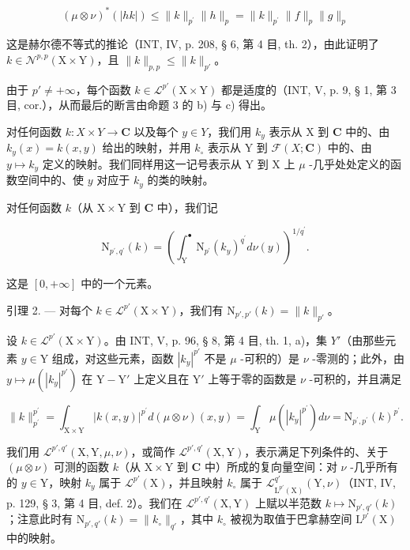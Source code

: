 \[
(\mu \otimes \nu) ^ {*} (| h k |) \leqslant \| k \| _ {p ^ {\prime}} \| h \| _ {p} = \| k \| _ {p ^ {\prime}} \| f \| _ {p} \| g \| _ {p}
\]

这是赫尔德不等式的推论（INT, IV, p. 208, § 6, 第 4 目, th. 2），由此证明了 \(k \in \mathcal{N}^{p,p}(\mathrm{X} \times \mathrm{Y})\)，且 \(\| k \|_{p,p} \leqslant \| k \|_{p'}\)。

由于 \(p' \neq +\infty\)，每个函数 \(k \in \mathcal{L}^{p'}(\mathrm{X} \times \mathrm{Y})\) 都是适度的（INT, V, p. 9, § 1, 第 3 目, cor.），从而最后的断言由命题 3 的 b) 与 c) 得出。

对任何函数 \(k\colon X \times Y \to \mathbf{C}\) 以及每个 \(y \in Y\)，我们用 \(k_y\) 表示从 X 到 \(\mathbf{C}\) 中的、由 \(k_y(x) = k(x, y)\) 给出的映射，并用 \(k_\circ\) 表示从 Y 到 \(\mathcal{F}(X; \mathbf{C})\) 中的、由 \(y \mapsto k_y\) 定义的映射。我们同样用这一记号表示从 Y 到 X 上 \(\mu\) -几乎处处定义的函数空间中的、使 \(y\) 对应于 \(k_y\) 的类的映射。

对任何函数 \(k\)（从 \(\mathrm{X} \times \mathrm{Y}\) 到 \(\mathbf{C}\) 中），我们记

\[
\mathrm{N} _ {p ^ {\prime}, q ^ {\prime}} (k) = \left(\int_ {\mathrm{Y}} ^ {\bullet} \mathrm{N} _ {p ^ {\prime}} (k _ {y}) ^ {q ^ {\prime}} d \nu (y)\right) ^ {1 / q ^ {\prime}}.
\]

这是 \([0, +\infty]\) 中的一个元素。

引理 2. --- 对每个 \(k \in \mathcal{L}^{p'}(\mathrm{X} \times \mathrm{Y})\)，我们有 \(\mathrm{N}_{p', p'}(k) = \| k \|_{p'}\)。

设 \(k \in \mathcal{L}^{p'}(\mathrm{X} \times \mathrm{Y})\)。由 INT, V, p. 96, § 8, 第 4 目, th. 1, a)，集 \(Y'\)（由那些元素 \(y \in \mathrm{Y}\) 组成，对这些元素，函数 \(|k_y|^{p'}\) 不是 \(\mu\) -可积的）是 \(\nu\) -零测的；此外，由 \(y \mapsto \mu(|k_y|^{p'})\) 在 \(\mathrm{Y} - \mathrm{Y}'\) 上定义且在 \(\mathrm{Y}'\) 上等于零的函数是 \(\nu\) -可积的，并且满足

\[
\| k \| _ {p ^ {\prime}} ^ {p ^ {\prime}} = \int_ {\mathrm{X} \times \mathrm{Y}} | k (x, y) | ^ {p ^ {\prime}} d (\mu \otimes \nu) (x, y) = \int_ {\mathrm{Y}} \mu (| k _ {y} | ^ {p ^ {\prime}}) d \nu = \mathrm{N} _ {p ^ {\prime}, p ^ {\prime}} (k) ^ {p ^ {\prime}}.
\]

我们用 \(\mathcal{L}^{p',q'}(\mathrm{X},\mathrm{Y},\mu,\nu)\)，或简作 \(\mathcal{L}^{p',q'}(\mathrm{X},\mathrm{Y})\)，表示满足下列条件的、关于 \((\mu\otimes\nu)\) 可测的函数 \(k\)（从 \(\mathrm{X}\times\mathrm{Y}\) 到 \(\mathbf{C}\) 中）所成的复向量空间：对 \(\nu\) -几乎所有的 \(y\in\mathrm{Y}\)，映射 \(k_y\) 属于 \(\mathcal{L}^{p'}(\mathrm{X})\)，并且映射 \(k_\circ\) 属于 \(\mathcal{L}^{q'}_{\mathrm{L}^{p'}(\mathrm{X})}(\mathrm{Y},\nu)\)（INT, IV, p. 129, § 3, 第 4 目, def. 2）。我们在 \(\mathcal{L}^{p',q'}(\mathrm{X},\mathrm{Y})\) 上赋以半范数 \(k\mapsto\mathrm{N}_{p',q'}(k)\)；注意此时有 \(\mathrm{N}_{p',q'}(k)=\|k_\circ\|_{q'}\)，其中 \(k_\circ\) 被视为取值于巴拿赫空间 \(\mathrm{L}^{p'}(\mathrm{X})\) 中的映射。


